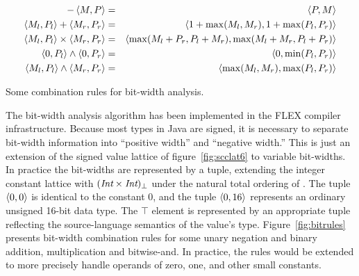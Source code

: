 \documentclass[12pt,titlepage,twoside]{article}
\begin{document}
\begin{myfigure}
\begin{eqnarray*}
-\left\langle M,P \right\rangle &=& \left\langle P,M \right\rangle\\
\left\langle M_l,P_l \right\rangle + \left\langle M_r,P_r \right\rangle &=& \left\langle 1+\max(M_l,M_r),1+\max(P_l,P_r) \right\rangle\\
\left\langle M_l,P_l \right\rangle \times \left\langle M_r,P_r \right\rangle &=& \left\langle \max(M_l+P_r,P_l+M_r),
                                             \max(M_l+M_r,P_l+P_r) \right\rangle\\
\left\langle 0,P_l \right\rangle \wedge \left\langle 0,P_r \right\rangle &=& \left\langle 0,\min(P_l,P_r) \right\rangle\\
\left\langle M_l,P_l \right\rangle\wedge \left\langle M_r,P_r \right\rangle &=& \left\langle \max(M_l,M_r),\max(P_l,P_r) \right\rangle
\end{eqnarray*}%
\caption{Some combination rules for bit-width analysis.}\label{fig:bitrules}
\end{myfigure}
The bit-width analysis algorithm has been implemented in the FLEX
compiler infrastructure.  Because most types in Java are signed, it is
necessary to separate bit-width information into ``positive width''
and ``negative width.''  This is just an extension of the
signed value lattice of figure~\ref{fig:scclat6} to variable
bit-widths.  In practice the bit-widths are represented by a tuple,
extending the integer constant lattice with
$({\mbox{\em Int}}\times{\mbox{\em Int}})_{\bot}$ under the natural total
ordering of .  The tuple $\left\langle 0,0 \right\rangle$ is identical to the
constant 0, and the tuple $\left\langle 0,16 \right\rangle$ represents an ordinary
unsigned 16-bit data type.  The $\top$ element is represented by an
appropriate tuple reflecting the source-language semantics of the
value's type.  Figure~\ref{fig:bitrules} presents bit-width
combination rules for some unary negation and binary addition,
multiplication and bitwise-and.  In practice, the rules would be
extended to more precisely handle operands of zero, one, and other
small constants.
\end{document}
